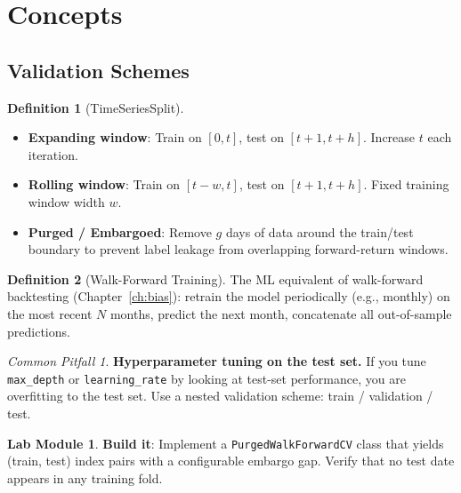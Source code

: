 \documentclass[a4paper, 11pt]{report}
\theoremstyle{definition}
\newtheorem{definition}{Definition}[chapter]
\newtheorem{labmod}{Lab Module}[chapter]
\theoremstyle{remark}
\newtheorem{pitfall}{Common Pitfall}[chapter]
\begin{document}
\section{Concepts}

\subsection{Validation Schemes}

\begin{definition}[TimeSeriesSplit]
    \begin{itemize}
        \item \textbf{Expanding window}: Train on $[0, t]$, test on
              $[t+1, t+h]$.  Increase $t$ each iteration.
        \item \textbf{Rolling window}: Train on $[t-w, t]$, test on
              $[t+1, t+h]$.  Fixed training window width $w$.
        \item \textbf{Purged / Embargoed}: Remove $g$ days of data around
              the train/test boundary to prevent label leakage from
              overlapping forward-return windows.
    \end{itemize}
\end{definition}

\begin{definition}[Walk-Forward Training]
    The ML equivalent of walk-forward backtesting (Chapter~\ref{ch:bias}):
    retrain the model periodically (e.g., monthly) on the most recent $N$
    months, predict the next month, concatenate all out-of-sample predictions.
\end{definition}

\begin{pitfall}
    \textbf{Hyperparameter tuning on the test set.}  If you tune
    \texttt{max\_depth} or \texttt{learning\_rate} by looking at test-set
    performance, you are overfitting to the test set.  Use a nested validation
    scheme: train / validation / test.
\end{pitfall}

\begin{labmod}
    \textbf{Build it}: Implement a \texttt{PurgedWalkForwardCV} class that
    yields (train, test) index pairs with a configurable embargo gap.  Verify
    that no test date appears in any training fold.
\end{labmod}


\end{document}
